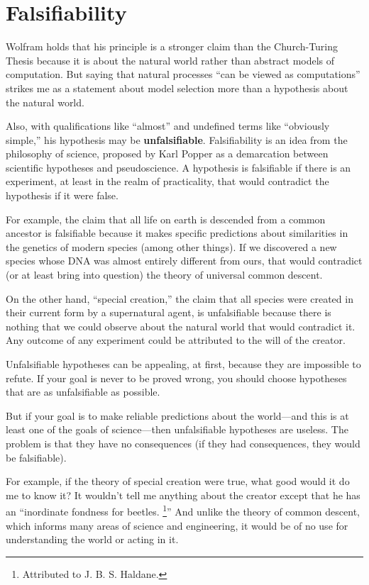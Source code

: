 \documentclass[10pt]{book}
\begin{document}
\section{Falsifiability}

Wolfram holds that his principle is a stronger claim than the
Church-Turing Thesis because it is about the natural world rather
than abstract models of computation.  But saying that natural processes
``can be viewed as computations'' strikes me as a statement about
model selection more than a hypothesis about the natural world.

Also, with qualifications like
``almost'' and undefined terms like ``obviously simple,'' his
hypothesis may be {\bf unfalsifiable}.  Falsifiability is
an idea from the philosophy of science, proposed by Karl Popper
as a demarcation between scientific hypotheses and pseudoscience.
A hypothesis is falsifiable if there is an experiment, at least
in the realm of practicality, that would contradict the hypothesis
if it were false.

For example, the claim that all life on earth is descended
from a common ancestor is falsifiable because it makes specific
predictions about similarities in the genetics of modern species
(among other things).  If we discovered a new species whose
DNA was almost entirely different from ours, that would
contradict (or at least bring into question) the theory of
universal common descent.

On the other hand, ``special creation,'' the claim that all species
were created in their current form by a supernatural agent, is
unfalsifiable because there is nothing that we could observe about the
natural world that would contradict it.  Any outcome of any experiment
could be attributed to the will of the creator.  

Unfalsifiable hypotheses can be appealing, at first, because
they are impossible to refute.  If your goal is never to be
proved wrong, you should choose hypotheses that are as
unfalsifiable as possible.

But if your goal is to make reliable predictions about the world---and
this is at least one of the goals of science---then unfalsifiable
hypotheses are useless.  The problem is that they have
no consequences (if they had consequences, they would be
falsifiable).

For example, if the theory of special creation were true, what good
would it do me to know it?  It wouldn't tell me anything about the
creator except that he has an ``inordinate fondness for beetles.
\footnote{Attributed to J. B. S. Haldane.}''  And unlike the
theory of common descent, which informs many areas of science
and engineering, it would be of no use for understanding
the world or acting in it.
\end{document}
